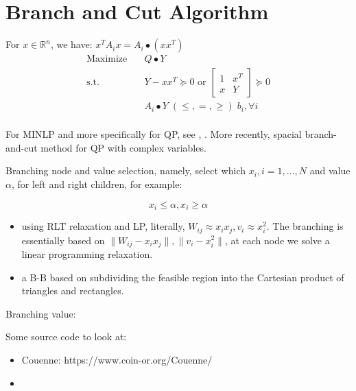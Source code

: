 \documentclass[../main]{subfiles}
\begin{document}
\section{Branch and Cut Algorithm}


For \(x \in \mathbb{R}^{n}\), we have: \(x^{T} A_{i} x = A_i \bullet (xx^T)\)
\begin{equation}
  \begin{aligned}
    \mathrm{Maximize}\quad & Q\bullet Y                                                        \\
    \mathrm{s.t.}  \quad   & Y-xx^T \succeq 0 \text { or } \begin{bmatrix} 1 & x^{T} \\ x & Y \end{bmatrix} \succeq 0 \\
                           & A_i \bullet Y \; (\le, =, \ge) \; b_i, \forall i                  \\
  \end{aligned}
\end{equation}

For MINLP and more specifically for QP, see \cite{belotti_mixed-integer_2013}, \cite{misener_glomiqo_2013}. More recently, spacial branch-and-cut method \cite{chen_spatial_2017} for QP with complex variables.


Branching node and value selection, namely, select which \(x_i, i = 1, ..., N\) and value \(\alpha\), for left and right children, for example:

\[x_i \le \alpha, x_i \ge \alpha\]

\begin{itemize}
  \item \cite{audet_branch_2000} using RLT relaxation and LP, literally, \(W_{ij} \approx x_i x_j , v_i \approx x_i^2\). The branching is essentially based on \(\|W_{ij} - x_ix_j\|, \|v_i - x_i^2\|\), at each node we solve a linear programming relaxation.
  \item \cite{linderoth_simplicial_2005} a B-B based on subdividing the feasible region into the Cartesian product of triangles and rectangles.

\end{itemize}
Branching value:


Some source code to look at:

\begin{itemize}
  \item Couenne: https://www.coin-or.org/Couenne/
  \item
\end{itemize}
\end{document}

